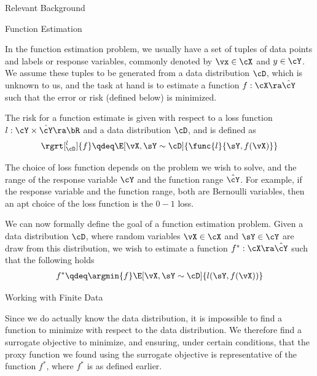 \documentclass{article}
\begin{document}
\begin{psection}{Relevant Background}

	\begin{psubsection}{Function Estimation}

		In the function estimation problem, we usually have a set of tuples of data points and labels or response variables, commonly denoted by $\vx \in \cX$ and $y \in \cY$. We assume these tuples to be generated from a data distribution $\cD$, which is unknown to us, and the task at hand is to estimate a function $f : \cX \ra \hat{\cY}$ such that the error or risk (defined below) is minimized.

		\begin{definition}[Risk]
			The risk for a function estimate is given with respect to a loss function $l : \cY \times \hat{\cY} \ra \bR$ and a data distribution $\cD$, and is defined as
			\begin{align*}
				\rgrt[_\cD^l]{f} \qdeq \E[\vX, \sY \sim \cD]{\func{l}{\sY, f(\vX)}}
			\end{align*}
			\label{def:risk}
		\end{definition}

		The choice of loss function depends on the problem we wish to solve, and the range of the response variable $\cY$ and the function range $\hat{\cY}$. For example, if the response variable and the function range, both are Bernoulli variables, then an apt choice of the loss function is the $0-1$ loss.

		We can now formally define the goal of a function estimation problem. Given a data distribution $\cD$, where random variables $\vX \in \cX$ and $\sY \in \cY$ are draw from this distribution, we wish to estimate a function $f^\ast : \cX \ra \hat{\cY}$ such that the following holds
		\begin{align*}
			f^\ast \qdeq \argmin{f} \E[\vX, \sY \sim \cD]{l(\sY, f(\vX))}
		\end{align*}

		\begin{pssubsection}{Working with Finite Data}

			Since we do actually know the data distribution, it is impossible to find a function to minimize with respect to the data distribution. We therefore find a surrogate objective to minimize, and ensuring, under certain conditions, that the proxy function we found using the surrogate objective is representative of the function $f^\ast$, where $f^\ast$ is as defined earlier.


\end{pssubsection}
\end{psubsection}
\end{psection}
\end{document}
